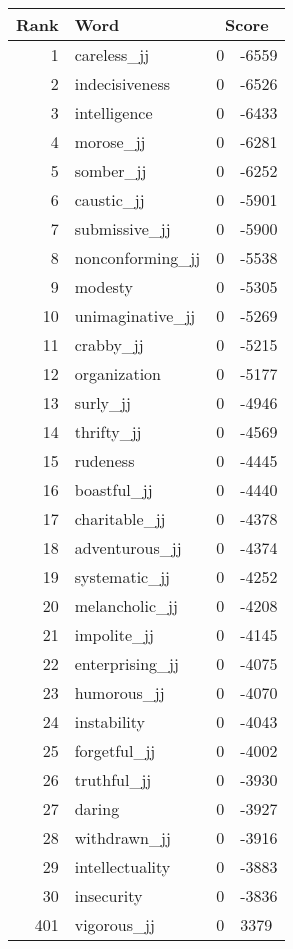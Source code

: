 \begin{longtable}[!htbp]{| rlr@{.}l |}
    \hline
    \textbf{Rank} & \textbf{Word} & \multicolumn{2}{c|}{\textbf{Score}} \\
    \hline
    \endhead
    1 & careless\_jj & 0 & -6559 \\
    2 & indecisiveness & 0 & -6526 \\
    3 & intelligence & 0 & -6433 \\
    4 & morose\_jj & 0 & -6281 \\
    5 & somber\_jj & 0 & -6252 \\
    6 & caustic\_jj & 0 & -5901 \\
    7 & submissive\_jj & 0 & -5900 \\
    8 & nonconforming\_jj & 0 & -5538 \\
    9 & modesty & 0 & -5305 \\
    10 & unimaginative\_jj & 0 & -5269 \\
    11 & crabby\_jj & 0 & -5215 \\
    12 & organization & 0 & -5177 \\
    13 & surly\_jj & 0 & -4946 \\
    14 & thrifty\_jj & 0 & -4569 \\
    15 & rudeness & 0 & -4445 \\
    16 & boastful\_jj & 0 & -4440 \\
    17 & charitable\_jj & 0 & -4378 \\
    18 & adventurous\_jj & 0 & -4374 \\
    19 & systematic\_jj & 0 & -4252 \\
    20 & melancholic\_jj & 0 & -4208 \\
    21 & impolite\_jj & 0 & -4145 \\
    22 & enterprising\_jj & 0 & -4075 \\
    23 & humorous\_jj & 0 & -4070 \\
    24 & instability & 0 & -4043 \\
    25 & forgetful\_jj & 0 & -4002 \\
    26 & truthful\_jj & 0 & -3930 \\
    27 & daring & 0 & -3927 \\
    28 & withdrawn\_jj & 0 & -3916 \\
    29 & intellectuality & 0 & -3883 \\
    30 & insecurity & 0 & -3836 \\
    401 & vigorous\_jj & 0 & 3379 \\

\end{longtable}
